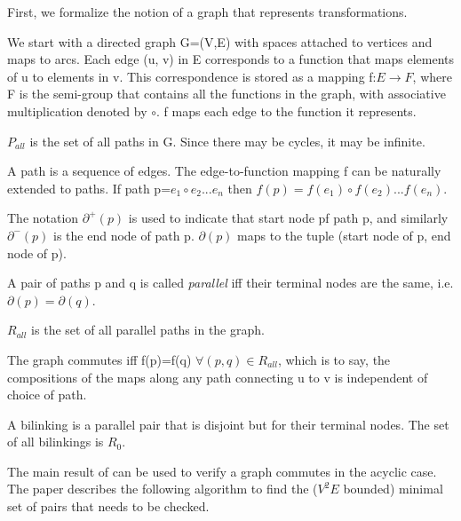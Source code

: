 \documentclass{article}
\begin{document}
First, we formalize the notion of a graph that represents transformations.

We start with a directed graph G=(V,E) with spaces attached to vertices and maps to arcs. Each edge (u, v) in E corresponds to a function that maps elements of u to elements in v. 
This correspondence is stored as a mapping f:$E\rightarrow F$, where F is the semi-group that contains all the functions in the graph, with associative multiplication denoted by $\circ$. f maps each edge to the function it represents.

$P_{all}$ is the set of all paths in G. Since there may be cycles, it may be infinite.

A path is a sequence of edges. The edge-to-function mapping f can be naturally extended to paths. If path p=$e_1\circ e_2 ... e_n$ then $f(p)=f(e_1) \circ f(e_2) ... f(e_n)$.

The notation $\partial^{+}(p)$ is used to indicate that start node pf path p, and similarly $\partial^-(p)$ is the end node of path p. $\partial(p)$ maps to the tuple (start node of p, end node of p).

A pair of paths p and q is called \textit{parallel} iff their terminal nodes are the same, i.e. $\partial(p)=\partial(q)$.

$R_{all}$ is the set of all parallel paths in the graph.

The graph commutes iff f(p)=f(q) $\forall (p,q)\in R_{all}$, which is to say, the compositions of the maps along any path connecting u to v is independent of choice of path.

A bilinking is a parallel pair that is disjoint but for their terminal nodes. The set of all bilinkings is $R_0$.


The main result of \cite{commutative} can be used to verify a graph commutes in the acyclic case. The paper describes the following algorithm to find the ($V^2E$ bounded) minimal set of pairs that needs to be checked.


\end{document}
